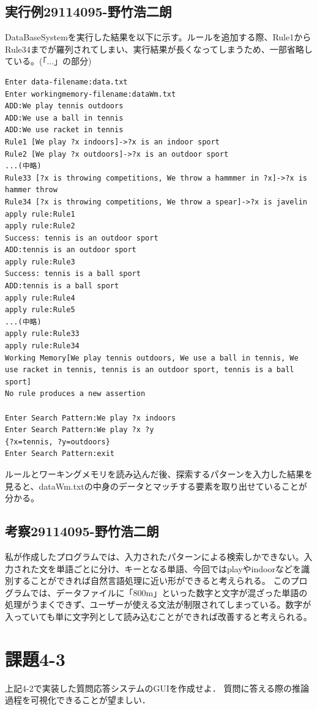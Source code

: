 \documentclass{jarticle}
\begin{document}
\subsection{実行例29114095-野竹浩二朗}
DataBaseSystemを実行した結果を以下に示す。ルールを追加する際、Rule1からRule34までが羅列されてしまい、実行結果が長くなってしまうため、一部省略している。(「...」の部分)
\begin{lstlisting}
Enter data-filename:data.txt
Enter workingmemory-filename:dataWm.txt
ADD:We play tennis outdoors
ADD:We use a ball in tennis
ADD:We use racket in tennis
Rule1 [We play ?x indoors]->?x is an indoor sport
Rule2 [We play ?x outdoors]->?x is an outdoor sport
...(中略)
Rule33 [?x is throwing competitions, We throw a hammmer in ?x]->?x is hammer throw
Rule34 [?x is throwing competitions, We throw a spear]->?x is javelin
apply rule:Rule1
apply rule:Rule2
Success: tennis is an outdoor sport
ADD:tennis is an outdoor sport
apply rule:Rule3
Success: tennis is a ball sport
ADD:tennis is a ball sport
apply rule:Rule4
apply rule:Rule5
...(中略)
apply rule:Rule33
apply rule:Rule34
Working Memory[We play tennis outdoors, We use a ball in tennis, We use racket in tennis, tennis is an outdoor sport, tennis is a ball sport]
No rule produces a new assertion

Enter Search Pattern:We play ?x indoors
Enter Search Pattern:We play ?x ?y
{?x=tennis, ?y=outdoors}
Enter Search Pattern:exit
\end{lstlisting}
ルールとワーキングメモリを読み込んだ後、探索するパターンを入力した結果を見ると、dataWm.txtの中身のデータとマッチする要素を取り出せていることが分かる。
\subsection{考察29114095-野竹浩二朗}
私が作成したプログラムでは、入力されたパターンによる検索しかできない。入力された文を単語ごとに分け、キーとなる単語、今回ではplayやindoorなどを識別することができれば自然言語処理に近い形ができると考えられる。
このプログラムでは、データファイルに「800m」といった数字と文字が混ざった単語の処理がうまくできず、ユーザーが使える文法が制限されてしまっている。数字が入っていても単に文字列として読み込むことができれば改善すると考えられる。

\section{課題4-3}
\begin{screen}
    上記4-2で実装した質問応答システムのGUIを作成せよ．
    質問に答える際の推論過程を可視化できることが望ましい．
\end{screen}
\end{document}
